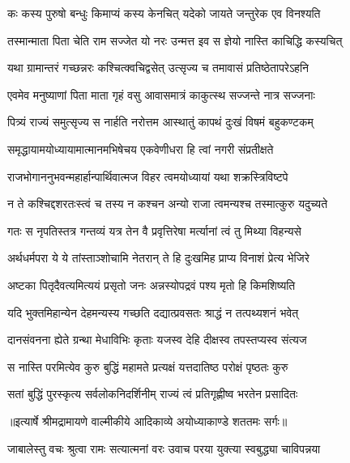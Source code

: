 \twolineshloka
{कः कस्य पुरुषो बन्धुः किमाप्यं कस्य केनचित्}
{यदेको जायते जन्तुरेक एव विनश्यति} %

\twolineshloka
{तस्मान्माता पिता चेति राम सज्जेत यो नरः}
{उन्मत्त इव स ज्ञेयो नास्ति काचिद्धि कस्यचित्} %

\twolineshloka
{यथा ग्रामान्तरं गच्छन्नरः कश्चित्क्वचिद्वसेत्}
{उत्सृज्य च तमावासं प्रतिष्ठेतापरेऽहनि} %

\twolineshloka
{एवमेव मनुष्याणां पिता माता गृहं वसु}
{आवासमात्रं काकुत्स्थ सज्जन्ते नात्र सज्जनाः} %

\twolineshloka
{पित्र्यं राज्यं समुत्सृज्य स नार्हति नरोत्तम}
{आस्थातुं कापथं दुःखं विषमं बहुकण्टकम्} %

\twolineshloka
{समृद्धायामयोध्यायामात्मानमभिषेचय}
{एकवेणीधरा हि त्वां नगरी संप्रतीक्षते} %

\twolineshloka
{राजभोगाननुभवन्महार्हान्पार्थिवात्मज}
{विहर त्वमयोध्यायां यथा शक्रस्त्रिविष्टपे} %

\twolineshloka
{न ते कश्चिद्दशरतःस्त्वं च तस्य न कश्चन}
{अन्यो राजा त्वमन्यश्च तस्मात्कुरु यदुच्यते} %

\twolineshloka
{गतः स नृपतिस्तत्र गन्तव्यं यत्र तेन वै}
{प्रवृत्तिरेषा मर्त्यानां त्वं तु मिथ्या विहन्यसे} %

\twolineshloka
{अर्थधर्मपरा ये ये तांस्ताञ्शोचामि नेतरान्}
{ते हि दुःखमिह प्राप्य विनाशं प्रेत्य भेजिरे} %

\twolineshloka
{अष्टका पितृदैवत्यमित्ययं प्रसृतो जनः}
{अन्नस्योपद्रवं पश्य मृतो हि किमशिष्यति} %

\twolineshloka
{यदि भुक्तमिहान्येन देहमन्यस्य गच्छति}
{दद्यात्प्रवसतः श्राद्धं न तत्पथ्यशनं भवेत्} %

\twolineshloka
{दानसंवनना ह्येते ग्रन्था मेधाविभिः कृताः}
{यजस्व देहि दीक्षस्व तपस्तप्यस्व संत्यज} %

\twolineshloka
{स नास्ति परमित्येव कुरु बुद्धिं महामते}
{प्रत्यक्षं यत्तदातिष्ठ परोक्षं पृष्ठतः कुरु} %

\twolineshloka
{सतां बुद्धिं पुरस्कृत्य सर्वलोकनिदर्शिनीम्}
{राज्यं त्वं प्रतिगृह्णीष्व भरतेन प्रसादितः} %


{॥इत्यार्षे श्रीमद्रामायणे वाल्मीकीये आदिकाव्ये अयोध्याकाण्डे शततमः सर्गः॥}


\twolineshloka
{जाबालेस्तु वचः श्रुत्वा रामः सत्यात्मनां वरः}
{उवाच परया युक्त्या स्वबुद्ध्या चाविपन्नया} %

